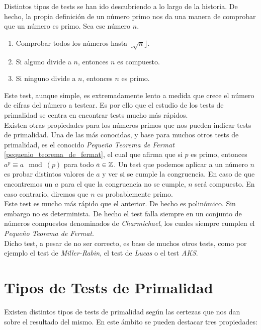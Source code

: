 Distintos tipos de tests se han ido descubriendo a lo largo de la historia. De hecho, la propia definición de un número primo nos da una manera de comprobar que un número es primo. Sea ese número $n$.

\begin{enumerate}
	\item Comprobar todos los números hasta $\lfloor\sqrt{n}\rfloor$.
	
	\item Si alguno divide a $n$, entonces $n$ es compuesto.
	
	\item Si ninguno divide a $n$, entonces $n$ es primo.
\end{enumerate}

Este test, aunque simple, es extremadamente lento a medida que crece el número de cifras del número a testear. Es por ello que el estudio de los tests de primalidad se centra en encontrar tests mucho más rápidos.\\

Existen otras propiedades para los números primos que nos pueden indicar tests de primalidad. Una de las más conocidas, y base para muchos otros tests de primalidad, es el conocido \textit{Pequeño Teorema de Fermat} \ref{pequenio_teorema_de_fermat}, el cual que afirma que si $p$ es primo, entonces $a^p \equiv a \mod(p)$ para todo $a \in \mathbb{Z}$. Un test que podemos aplicar a un número $n$ es probar distintos valores de $a$ y ver si se cumple la congruencia. En caso de que encontremos un $a$ para el que la congruencia no se cumple, $n$ será compuesto. En caso contrario, diremos que $n$ es probablemente primo.\\

Este test es mucho más rápido que el anterior. De hecho es polinómico. Sin embargo no es determinista. De hecho el test falla siempre en un conjunto de números compuestos denominados de \textit{Charmichael}, los cuales siempre cumplen el \textit{Pequeño Teorema de Fermat}.\\

Dicho test, a pesar de no ser correcto, es base de muchos otros tests, como por ejemplo el test de \textit{Miller-Rabin}, el test de \textit{Lucas} o el test \textit{AKS}.

\section{Tipos de Tests de Primalidad}

Existen distintos tipos de tests de primalidad según las certezas que nos dan sobre el resultado del mismo. En este ámbito se pueden destacar tres propiedades:

